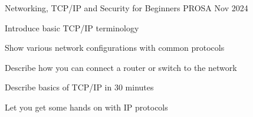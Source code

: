 \documentclass[Screen16to9,17pt]{foils}
\begin{document}









\mytitlepage
{Networking, TCP/IP and Security for Beginners}
{PROSA Nov 2024}


\hlkprofiluk



\begin{list2}
\item Introduce basic TCP/IP terminology
\item Show various network configurations with common protocols
\item Describe how you can connect a router or switch to the network
\item Describe basics of TCP/IP in 30 minutes
\item Let you get some hands on with IP protocols
\end{list2}
\end{document}
